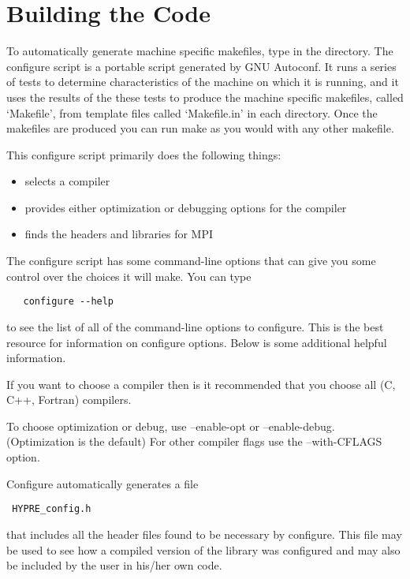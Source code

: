 \chapter{Building the Code}
\label{Building the Code}

To automatically generate machine specific makefiles, type
 in the  directory.  The configure
script is a portable script generated by GNU Autoconf.  It runs a
series of tests to determine characteristics of the machine on which
it is running, and it uses the results of the these tests to produce
the machine specific makefiles, called `Makefile', from template files
called `Makefile.in' in each directory.  Once the makefiles are
produced you can run make as you would with any other makefile.

This configure script primarily does the following things:
\begin{itemize}
\item selects a compiler
\item provides either optimization or debugging options for the compiler
\item finds the headers and libraries for MPI
\end{itemize}

The configure script has some command-line options that can give you
some control over the choices it will make.  You can type
\begin{verbatim}
   configure --help
\end{verbatim}
to see the list of all of the command-line options to configure. This is
the best resource for information on configure options.  Below is some
additional helpful information.


\begin{description}

\item[Compilers] If you want to choose a compiler then is it recommended
that you choose all (C, C++, Fortran) compilers.

\item[Compiler Flags] To choose optimization or debug, use --enable-opt
or --enable-debug.  (Optimization is the default)  For other compiler 
flags use the --with-CFLAGS option.  

\item

\end{description}


Configure automatically generates a file 
\begin{verbatim} HYPRE_config.h \end{verbatim}that includes all the
header files found to be necessary by configure.  This file may be used
to see how a compiled version of the library was configured and may also
be included by the user in his/her own code.
